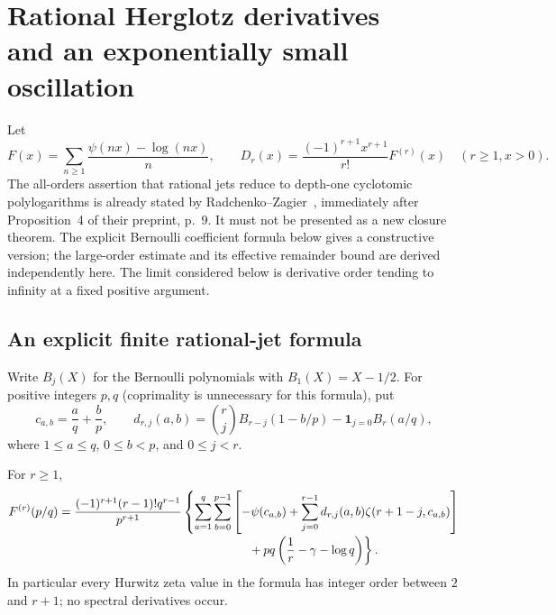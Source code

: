 \section[Rational Herglotz derivatives and an exponentially small oscillation]{Rational Herglotz derivatives\\and an exponentially small oscillation}
\label{sec:herglotz}

Let
\[
 F(x)=\sum_{n\ge1}\frac{\psi(nx)-\log(nx)}n,\qquad
 D_r(x)=\frac{(-1)^{r+1}x^{r+1}}{r!}F^{(r)}(x)
 \quad(r\ge1, x>0).
\]
The all-orders assertion that rational jets reduce to depth-one cyclotomic
polylogarithms is already stated by Radchenko--Zagier~\cite{RZ}, immediately after
Proposition~4 of their preprint, p.~9. It must not be presented as a new
closure theorem. The explicit Bernoulli coefficient formula below gives a
constructive version; the large-order estimate and its effective remainder
bound are derived independently here. The limit considered below is derivative order tending to infinity at a fixed positive argument.

\subsection{An explicit finite rational-jet formula}

Write $B_j(X)$ for the Bernoulli polynomials with $B_1(X)=X-1/2$.
For positive integers $p,q$ (coprimality is unnecessary for this formula), put
\[
 c_{a,b}=\frac aq+\frac bp,\qquad
 d_{r,j}(a,b)=\binom rj B_{r-j}(1-b/p)
              -\mathbf1_{j=0}B_r(a/q),
\]
where $1\le a\le q$, $0\le b<p$, and $0\le j<r$.

\begin{theorem}\label{thm:rational-jets}
For $r\ge1$,
\begin{align*}
F^{(r)}(p/q)
={}&\frac{(-1)^{r+1}(r-1)!q^{r-1}}{p^{r+1}}
\left\{
\sum_{a=1}^{q}\sum_{b=0}^{p-1}
\left[-\psi(c_{a,b})+
 \sum_{j=0}^{r-1}d_{r,j}(a,b)\zeta(r+1-j,c_{a,b})\right]
\right.\\[-2pt]
&\hspace{50mm}\left.{}+pq\left(\frac1r-\gamma-\log q\right)
\right\}.
\end{align*}
In particular every Hurwitz zeta value in the formula has integer order
between $2$ and $r+1$; no spectral derivatives occur.
\end{theorem}

